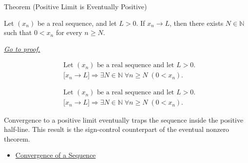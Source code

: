 \begin{theorembox}{Theorem (Positive Limit is Eventually Positive)}
\begin{theorem}
\label{thm:positive-limit-eventually-positive}
Let $(x_n)$ be a real sequence, and let $L>0$. If $x_n\to L$, then there
exists $N\in\mathbb{N}$ such that $0<x_n$ for every $n\ge N$.

\smallskip
\noindent
\hyperref[prf:positive-limit-eventually-positive]{\textit{Go to proof.}}
\end{theorem}
\end{theorembox}

\begin{remark*}
\[
\begin{aligned}
&\text{Let } (x_n) \text{ be a real sequence and let } L>0.\\
&\bigl[x_n\to L\bigr]
\Longrightarrow
\exists N\in\mathbb{N}\;\forall n\ge N\;(0<x_n).
\end{aligned}
\]
\end{remark*}

\begin{remark*}
\[
\begin{aligned}
&\text{Let } (x_n) \text{ be a real sequence and let } L>0.\\
&\bigl[x_n\to L\bigr]
\Longrightarrow
\exists N\in\mathbb{N}\;\forall n\ge N\;(0<x_n).
\end{aligned}
\]
\end{remark*}

\begin{remark*}[Interpretation]
Convergence to a positive limit eventually traps the sequence inside the
positive half-line. This result is the sign-control counterpart of the
eventual nonzero theorem.
\end{remark*}

\begin{dependencies}
\begin{itemize}
  \item \hyperref[def:convergent-sequence]{Convergence of a Sequence}
\end{itemize}
\end{dependencies}


